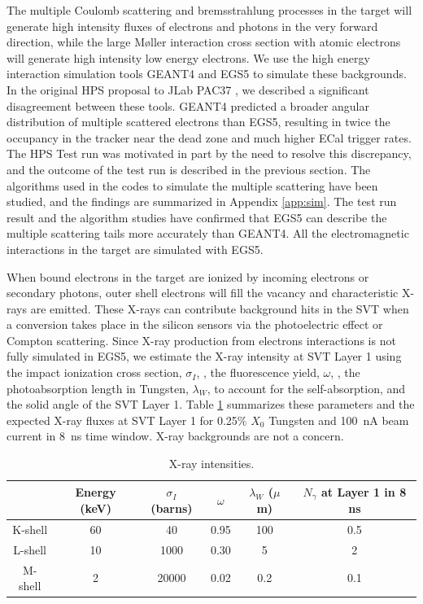The multiple Coulomb scattering and bremsstrahlung processes in the target will generate high 
intensity fluxes of electrons and photons in the very forward direction, while the large
M{\o}ller interaction cross section with atomic electrons will generate high intensity low energy
electrons. We use the high energy interaction simulation tools GEANT4 and EGS5 to simulate 
these backgrounds. In the original HPS proposal to JLab PAC37 \cite{HPS_PROP}, we described a significant 
disagreement between these tools. GEANT4 predicted a broader angular
distribution of multiple scattered electrons than EGS5, resulting in twice the occupancy in the
tracker near the dead zone and much higher ECal trigger rates. 
The HPS Test run was motivated in part by the need to resolve this discrepancy, and the outcome of the test run is described 
in the previous section. The algorithms used 
in the codes to simulate the multiple scattering have been studied, and the findings are summarized in
Appendix \ref{app:sim}. The test run result and the algorithm studies have confirmed that EGS5 can describe the multiple scattering 
tails more accurately than GEANT4. All the electromagnetic interactions in the target are simulated with EGS5.   

When bound electrons in the target are ionized by incoming electrons or secondary photons, outer 
shell electrons will fill the vacancy and characteristic X-rays are emitted. 
These X-rays can contribute background hits in
the SVT when a conversion takes place in the silicon sensors via the photoelectric effect 
or Compton scattering. Since X-ray production from electrons interactions is not fully simulated in EGS5, we estimate the X-ray intensity at SVT Layer 1 using the impact ionization cross section, $\sigma_I$, \cite{hoffmann}, the fluorescence yield, $\omega$, \cite{hubbell},
the photoabsorption length in Tungsten, $\lambda_W$, to account for the self-absorption, and the solid 
angle of the SVT Layer 1.
Table \ref{tab:xray} summarizes these parameters and the expected X-ray
fluxes at SVT Layer 1 for 0.25\% $X_0$ Tungsten and 100~nA beam current in 8~ns time window. 
X-ray backgrounds are not a concern.

\begin{table}[ht]
\begin{center}
\begin{tabular}{|c|c|c|c|c|c|} \hline
  & Energy (keV) & $\sigma_I$ (barns) & \hspace{0.5 cm} $\omega$ \hspace{0.5 cm} & $\lambda_W$ ($\mu$m) & $N_\gamma$ at Layer 1 in 8 ns   \\ \hline
K-shell & 60 & 40 & 0.95 & 100 & 0.5 \\ \hline
L-shell  & 10 & 1000 & 0.30 & 5 & 2 \\ \hline
M-shell  & 2 & 20000 & 0.02 & 0.2 & 0.1 \\ \hline
\end{tabular}
\end{center}
\caption{\small{X-ray intensities.}}
\label{tab:xray}
\end{table}

